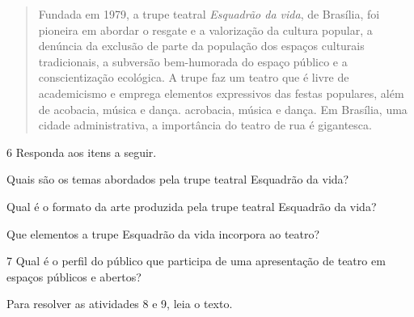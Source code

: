 \begin{quote}
Fundada em 1979, a trupe teatral \emph{Esquadrão da vida}, de Brasília,
foi pioneira em abordar o resgate e a valorização da cultura popular, a
denúncia da exclusão de parte da população dos espaços culturais tradicionais,
a subversão bem-humorada do espaço público e a conscientização ecológica.
A trupe faz um teatro que é livre de academicismo e emprega elementos
expressivos das festas populares, além de acobacia, música e dança.
acrobacia, música e dança. Em Brasília, uma cidade administrativa,
a importância do teatro de rua é gigantesca.

\end{quote}

\num{6}  Responda aos itens a seguir.

\begin{escolha}
\item Quais são os temas abordados pela trupe teatral Esquadrão da vida?


\item Qual é o formato da arte produzida pela trupe teatral Esquadrão da vida?


\item Que elementos a trupe Esquadrão da vida incorpora ao teatro?

\end{escolha}

\num{7} Qual é o perfil do público que participa de uma apresentação de teatro em espaços públicos e abertos?



Para resolver as atividades 8 e 9, leia o texto.

